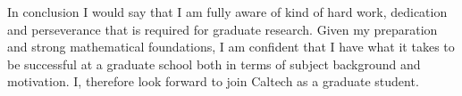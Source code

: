 \documentclass[11pt]{article}
\begin{document}
\medskip
In conclusion I would say that I am fully aware of kind of hard work, dedication and perseverance that is required for graduate research. Given my preparation and strong mathematical foundations,  I am confident that I have what it takes to be successful at a graduate school both in terms of subject background and motivation. I, therefore look forward to join Caltech as a graduate student.
\end{document}
